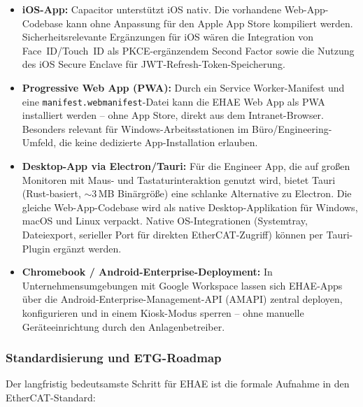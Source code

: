 ﻿\documentclass[12pt,a4paper]{article}
\begin{document}
\begin{itemize}[leftmargin=2em]
  \item \textbf{iOS-App:} Capacitor unterstützt iOS nativ. Die vorhandene
    Web-App-Codebase kann ohne Anpassung für den Apple App Store kompiliert
    werden. Sicherheitsrelevante Ergänzungen für iOS wären die Integration von
    Face~ID/Touch~ID als PKCE-ergänzendem Second Factor sowie die Nutzung
    des iOS Secure Enclave für JWT-Refresh-Token-Speicherung.
  \item \textbf{Progressive Web App (PWA):} Durch ein Service Worker-Manifest
    und eine \texttt{manifest.webmanifest}-Datei kann die EHAE Web App als
    PWA installiert werden -- ohne App Store, direkt aus dem Intranet-Browser.
    Besonders relevant für Windows-Arbeitsstationen im Büro/Engineering-Umfeld,
    die keine dedizierte App-Installation erlauben.
  \item \textbf{Desktop-App via Electron/Tauri:} Für die Engineer App, die
    auf großen Monitoren mit Maus- und Tastaturinteraktion genutzt wird, bietet
    Tauri (Rust-basiert, $\sim$3\,MB Binärgröße) eine schlanke Alternative zu
    Electron. Die gleiche Web-App-Codebase wird als native Desktop-Applikation
    für Windows, macOS und Linux verpackt. Native OS-Integrationen (Systemtray,
    Dateiexport, serieller Port für direkten EtherCAT-Zugriff) können per
    Tauri-Plugin ergänzt werden.
  \item \textbf{Chromebook / Android-Enterprise-Deployment:} In
    Unternehmensumgebungen mit Google Workspace lassen sich EHAE-Apps
    über die Android-Enterprise-Management-API (AMAPI) zentral deployen,
    konfigurieren und in einem Kiosk-Modus sperren -- ohne manuelle
    Geräteeinrichtung durch den Anlagenbetreiber.
\end{itemize}

\subsubsection*{Standardisierung und ETG-Roadmap}

Der langfristig bedeutsamste Schritt für EHAE ist die formale Aufnahme in den
EtherCAT-Standard:
\end{document}
